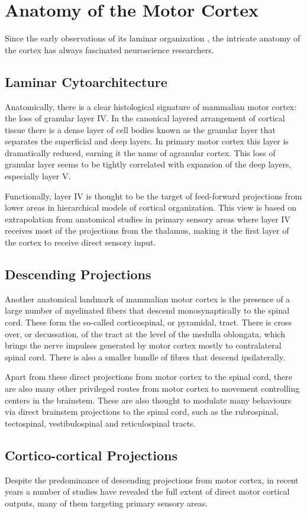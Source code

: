 \section{Anatomy of the Motor Cortex}

Since the early observations of its laminar organization \cite{Baillarger1840}, the intricate anatomy of the cortex has always fascinated neuroscience researchers.

\subsection{Laminar Cytoarchitecture}

Anatomically, there is a clear histological signature of mammalian motor cortex: the loss of granular layer IV. In the canonical layered arrangement of cortical tissue there is a dense layer of cell bodies known as the granular layer that separates the superficial and deep layers. In primary motor cortex this layer is dramatically reduced, earning it the name of agranular cortex. This loss of granular layer seems to be tightly correlated with expansion of the deep layers, especially layer V.

Functionally, layer IV is thought to be the target of feed-forward projections from lower areas in hierarchical models of cortical organization. This view is based on extrapolation from anatomical studies in primary sensory areas where layer IV receives most of the projections from the thalamus, making it the first layer of the cortex to receive direct sensory input.

\subsection{Descending Projections}

Another anatomical landmark of mammalian motor cortex is the presence of a large number of myelinated fibers that descend monosynaptically to the spinal cord. These form the so-called corticospinal, or pyramidal, tract. There is cross over, or decussation, of the tract at the level of the medulla oblongata, which brings the nerve impulses generated by motor cortex mostly to contralateral spinal cord. There is also a smaller bundle of fibres that descend ipsilaterally.

Apart from these direct projections from motor cortex to the spinal cord, there are also many other privileged routes from motor cortex to movement controlling centers in the brainstem. These are also thought to modulate many behaviours via direct brainstem projections to the spinal cord, such as the rubrospinal, tectospinal, vestibulospinal and reticulospinal tracts.

\subsection{Cortico-cortical Projections}

Despite the predominance of descending projections from motor cortex, in recent years a number of studies have revealed the full extent of direct motor cortical outputs, many of them targeting primary sensory areas.
